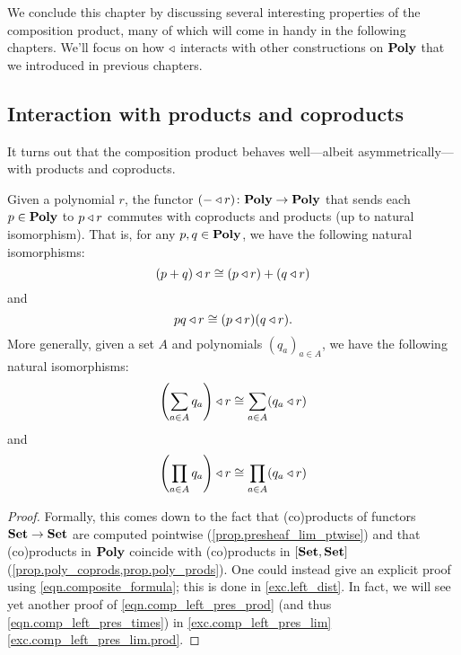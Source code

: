 \documentclass[Book-Poly]{subfiles}
\begin{document}
We conclude this chapter by discussing several interesting properties of the composition product, many of which will come in handy in the following chapters.
We'll focus on how $\mathbin{\triangleleft}$ interacts with other constructions on $\mathbf{Poly}$ that we introduced in previous chapters.

\subsection{Interaction with products and coproducts} \label{subsec.comon.comp.prop.prod}

It turns out that the composition product behaves well---albeit asymmetrically---with products and coproducts.

\begin{proposition}\label{prop.left_dist_prod}
Given a polynomial $r$, the functor $(-\mathbin{\triangleleft} r)\colon\mathbf{Poly}\to\mathbf{Poly}$ that sends each $p\in\mathbf{Poly}$ to $p\mathbin{\triangleleft} r$ commutes with coproducts and products (up to natural isomorphism).
That is, for any $p,q\in\mathbf{Poly}$, we have the following natural isomorphisms:
\begin{equation}\label{eqn.comp_left_pres_plus}
    (p+q)\mathbin{\triangleleft} r\cong (p\mathbin{\triangleleft} r)+(q\mathbin{\triangleleft} r)
\end{equation}
and
\begin{equation}\label{eqn.comp_left_pres_times}
    pq\mathbin{\triangleleft} r\cong (p\mathbin{\triangleleft} r)(q\mathbin{\triangleleft} r).
\end{equation}
More generally, given a set $A$ and polynomials $(q_a)_{a\in A}$, we have the following natural isomorphisms:
\begin{equation}\label{eqn.comp_left_pres_sum}
    \left(\sum_{a\in A}q_a\right)\mathbin{\triangleleft} r\cong \sum_{a\in A} (q_a\mathbin{\triangleleft} r)
\end{equation}
and
\begin{equation}\label{eqn.comp_left_pres_prod}
    \left(\prod_{a\in A}q_a\right)\mathbin{\triangleleft} r\cong \prod_{a\in A} (q_a\mathbin{\triangleleft} r)
\end{equation}
\end{proposition} 
\begin{proof}
Formally, this comes down to the fact that (co)products of functors $\mathbf{Set}\to\mathbf{Set}$ are computed pointwise (\cref{prop.presheaf_lim_ptwise}) and that (co)products in $\mathbf{Poly}$ coincide with (co)products in $[\mathbf{Set},\mathbf{Set}]$ (\cref{prop.poly_coprods,prop.poly_prods}).
One could instead give an explicit proof using \eqref{eqn.composite_formula}; this is done in \cref{exc.left_dist}.
In fact, we will see yet another proof of \eqref{eqn.comp_left_pres_prod} (and thus \eqref{eqn.comp_left_pres_times}) in \cref{exc.comp_left_pres_lim} \cref{exc.comp_left_pres_lim.prod}.
\end{proof}
\end{document}
